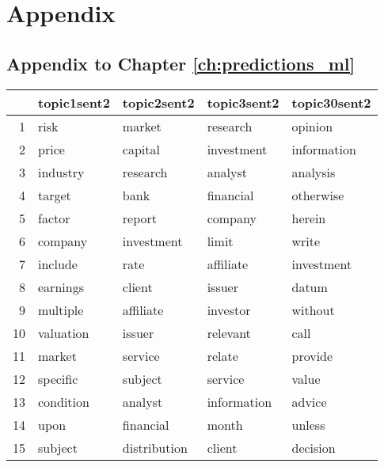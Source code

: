 \chapter{Appendix}\label{ch:appAlabel}






\section{Appendix to Chapter \ref{ch:predictions_ml}}

\begin{table}[ht]
\centering
\begin{tabular}{rllll}
  \hline
 & topic1sent2 & topic2sent2 & topic3sent2 & topic30sent2 \\ 
  \hline
1 & risk & market & research & opinion \\ 
  2 & price & capital & investment & information \\ 
  3 & industry & research & analyst & analysis \\ 
  4 & target & bank & financial & otherwise \\ 
  5 & factor & report & company & herein \\ 
  6 & company & investment & limit & write \\ 
  7 & include & rate & affiliate & investment \\ 
  8 & earnings & client & issuer & datum \\ 
  9 & multiple & affiliate & investor & without \\ 
  10 & valuation & issuer & relevant & call \\ 
  11 & market & service & relate & provide \\ 
  12 & specific & subject & service & value \\ 
  13 & condition & analyst & information & advice \\ 
  14 & upon & financial & month & unless \\ 
  15 & subject & distribution & client & decision \\ 
   \hline
\end{tabular}
\label{tab:postProbSent2}
\end{table}



